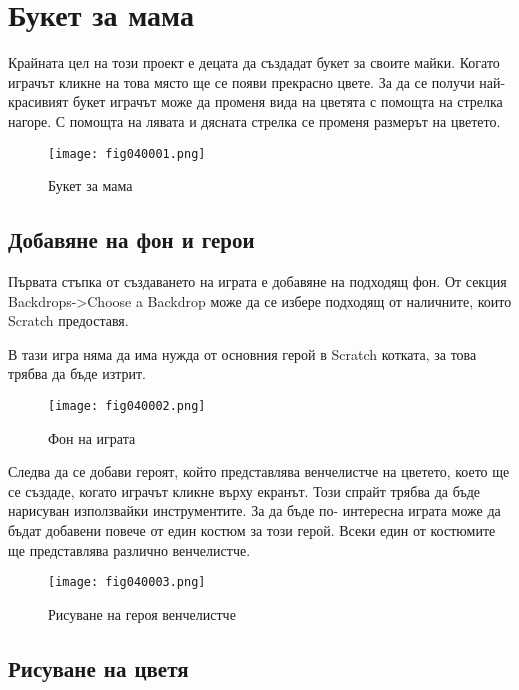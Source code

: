 \chapter{Букет за мама}

Крайната цел на този проект е децата да създадат букет за своите майки. Когато играчът кликне на това място ще се появи прекрасно цвете. За да се получи най- красивият букет играчът може да променя вида на цветята с помощта на стрелка нагоре. С помощта на лявата и дясната стрелка се променя размерът на цветето.

\begin{figure}[H]
  \centering
  \texttt{[image: fig040001.png]}
  \caption{Букет за мама}
\label{fig040001}
\end{figure}

\section{Добавяне на фон и герои}
Първата стъпка от създаването на играта е добавяне на подходящ фон. От секция Backdrops->Choose a Backdrop може да се избере подходящ от наличните, които Scratch предоставя.

В тази игра няма да има нужда от основния герой в Scratch котката, за това трябва да бъде изтрит.

\begin{figure}[H]
  \centering
  \texttt{[image: fig040002.png]}
  \caption{Фон на играта}
\label{fig040002}
\end{figure}

Следва да се добави героят, който представлява венчелистче на цветето, което ще се създаде, когато играчът кликне върху екранът. Този спрайт трябва да бъде нарисуван използвайки инструментите. За да бъде по- интересна играта може да бъдат добавени повече от един костюм за този герой. Всеки един от костюмите ще представлява различно венчелистче.

\begin{figure}[H]
  \centering
  \texttt{[image: fig040003.png]}
  \caption{Рисуване на героя венчелистче}
\label{fig040003}
\end{figure}

\section{Рисуване на цветя}

